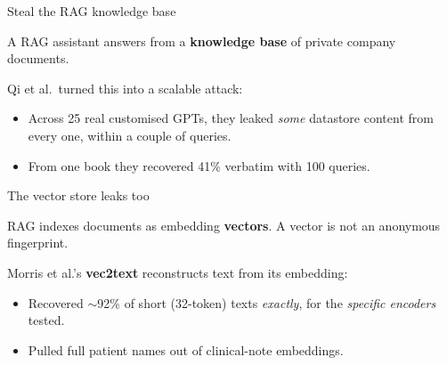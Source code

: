 \documentclass[12pt,aspectratio=169,handout]{beamer}
\begin{document}
\begin{frame}{Steal the RAG knowledge base}
A RAG assistant answers from a \textbf{knowledge base} of private company documents. 

\vspace{0.2em}
Qi et al.\ turned this into a scalable attack:
\begin{itemize}
	\item Across 25 real customised GPTs, they leaked \emph{some} datastore content from \alert{every one}, within a couple of queries.
	\item From one book they recovered \alert{41\%} verbatim with 100 queries.
\end{itemize}

\end{frame}


\begin{frame}{The vector store leaks too}
RAG indexes documents as embedding \textbf{vectors}. A vector is not an anonymous fingerprint.

\vspace{0.3em}
Morris et al.'s \textbf{vec2text} reconstructs text from its embedding:
\begin{itemize}
	\item Recovered \alert{$\sim$92\%} of short (32-token) texts \emph{exactly}, for the \emph{specific encoders} tested.
	\item Pulled full patient names out of clinical-note embeddings.
\end{itemize}

\end{frame}
\end{document}

